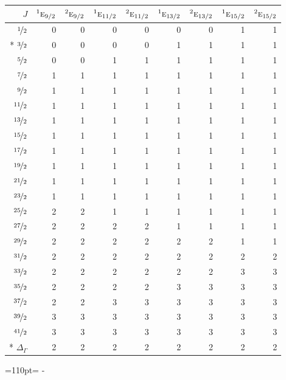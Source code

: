 \documentclass[10pt,a4paper]{article}
\makeatletter
\def\grouprule#1#2{\noalign{\marks\LTgroupmarks{\the\belowrulesep}\nobreak\vskip#1%
  \vskip\aboverulesep}\multispan\LT@cols\unskip{\leaders\hrule\@height#2\hfill\kern\z@}\cr
  \noalign{\penalty\LTrulebreak\vskip\belowrulesep\global\@lastruleclass\z@}}
\newcommand{\needspace}[1]{\par\penalty-100\begingroup\dimen0=#1\relax\dimen2=\pagegoal
  \advance\dimen2-\pagetotal\ifdim\dimen0>\dimen2\relax\ifdim\dimen2>0pt\vfil\break\fi\fi
  \endgroup}
\numberwithin{equation}{section}
\newcommand{\irr}[1]{\text{\normalfont\scshape #1}}
\newcommand{\conjpair}[1]{{}^{#1}}
\makeatother
\begin{document}
{\small\begin{longtable}{@{}rrrrrrrrr@{}}\toprule
$J$ & $\conjpair{1}\irr{e}_{9/2}$ & $\conjpair{2}\irr{e}_{9/2}$ & $\conjpair{1}\irr{e}_{11/2}$ & $\conjpair{2}\irr{e}_{11/2}$ & $\conjpair{1}\irr{e}_{13/2}$ & $\conjpair{2}\irr{e}_{13/2}$ & $\conjpair{1}\irr{e}_{15/2}$ & $\conjpair{2}\irr{e}_{15/2}$\\\midrule\endhead
\bottomrule\endfoot\endlastfoot
$\nicefrac{1}{2}$ & 0 & 0 & 0 & 0 & 0 & 0 & 1 & 1\\*
$\nicefrac{3}{2}$ & 0 & 0 & 0 & 0 & 1 & 1 & 1 & 1\\
$\nicefrac{5}{2}$ & 0 & 0 & 1 & 1 & 1 & 1 & 1 & 1\\
$\nicefrac{7}{2}$ & 1 & 1 & 1 & 1 & 1 & 1 & 1 & 1\\
$\nicefrac{9}{2}$ & 1 & 1 & 1 & 1 & 1 & 1 & 1 & 1\\
$\nicefrac{11}{2}$ & 1 & 1 & 1 & 1 & 1 & 1 & 1 & 1\\
$\nicefrac{13}{2}$ & 1 & 1 & 1 & 1 & 1 & 1 & 1 & 1\\
$\nicefrac{15}{2}$ & 1 & 1 & 1 & 1 & 1 & 1 & 1 & 1\\
$\nicefrac{17}{2}$ & 1 & 1 & 1 & 1 & 1 & 1 & 1 & 1\\
$\nicefrac{19}{2}$ & 1 & 1 & 1 & 1 & 1 & 1 & 1 & 1\\
$\nicefrac{21}{2}$ & 1 & 1 & 1 & 1 & 1 & 1 & 1 & 1\\
$\nicefrac{23}{2}$ & 1 & 1 & 1 & 1 & 1 & 1 & 1 & 1\\
$\nicefrac{25}{2}$ & 2 & 2 & 1 & 1 & 1 & 1 & 1 & 1\\
$\nicefrac{27}{2}$ & 2 & 2 & 2 & 2 & 1 & 1 & 1 & 1\\
$\nicefrac{29}{2}$ & 2 & 2 & 2 & 2 & 2 & 2 & 1 & 1\\
$\nicefrac{31}{2}$ & 2 & 2 & 2 & 2 & 2 & 2 & 2 & 2\\
$\nicefrac{33}{2}$ & 2 & 2 & 2 & 2 & 2 & 2 & 3 & 3\\
$\nicefrac{35}{2}$ & 2 & 2 & 2 & 2 & 3 & 3 & 3 & 3\\
$\nicefrac{37}{2}$ & 2 & 2 & 3 & 3 & 3 & 3 & 3 & 3\\
$\nicefrac{39}{2}$ & 3 & 3 & 3 & 3 & 3 & 3 & 3 & 3\\
$\nicefrac{41}{2}$ & 3 & 3 & 3 & 3 & 3 & 3 & 3 & 3\\*
\grouprule{0pt}{\lightrulewidth} $\Delta_\Gamma$ & 2 & 2 & 2 & 2 & 2 & 2 & 2 & 2\\
\bottomrule\end{longtable}}
\needspace{110pt}
\end{document}
